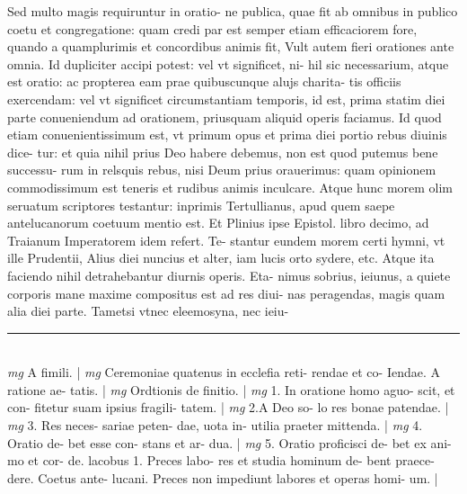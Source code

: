 \documentclass{article}
\begin{document}
\begin{pages}
Sed multo magis requiruntur in oratio- ne publica, quae fit ab omnibus in publico coetu et congregatione: quam credi par est semper etiam efficaciorem fore, quando a quamplurimis et concordibus animis fit, Vult autem fieri orationes ante omnia. Id dupliciter accipi potest: vel vt significet, ni- hil sic necessarium, atque est oratio: ac propterea eam prae quibuscunque  alujs charita- tis officiis exercendam: vel vt significet circumstantiam temporis, id est, prima statim diei parte conueniendum ad orationem, priusquam aliquid operis faciamus. Id quod etiam conuenientissimum est, vt primum opus et prima diei portio rebus diuinis dice- tur: et quia nihil prius Deo habere debemus, non est quod putemus bene successu- rum in relsquis rebus, nisi Deum prius orauerimus: quam opinionem commodissimum est teneris et rudibus animis inculcare. Atque hunc morem olim seruatum scriptores testantur: inprimis Tertullianus, apud quem saepe antelucanorum coetuum mentio est. Et Plinius ipse Epistol. libro decimo, ad Traianum Imperatorem idem refert. Te- stantur eundem morem certi hymni, vt ille Prudentii, Alius diei nuncius et alter, iam lucis orto sydere, etc. Atque ita faciendo nihil detrahebantur diurnis operis. Eta- nimus sobrius, ieiunus, a quiete corporis mane maxime compositus est ad res diui- nas peragendas, magis quam alia diei parte. Tametsi vtnec eleemosyna, nec ieiu-  \pend
\vspace{0.5cm}\noindent
\vspace{0.2cm}\rule{1cm}{0.2pt}\\ 
\hspace{0.2cm}\textit{mg}
\footnotesize A fimili. 
\normalsize| 
\hspace{0.2cm}\textit{mg}
\footnotesize Ceremoniae quatenus in ecclefia reti- rendae et co- Iendae. A ratione ae- tatis. 
\normalsize| 
\hspace{0.2cm}\textit{mg}
\footnotesize Ordtionis de finitio. 
\normalsize| 
\hspace{0.2cm}\textit{mg}
\footnotesize 1. In oratione homo aguo- scit, et con- fitetur suam ipsius fragili- tatem. 
\normalsize| 
\hspace{0.2cm}\textit{mg}
\footnotesize 2.A Deo so- lo res bonae patendae. 
\normalsize| 
\hspace{0.2cm}\textit{mg}
\footnotesize 3. Res neces- sariae peten- dae, uota in- utilia praeter mittenda. 
\normalsize| 
\hspace{0.2cm}\textit{mg}
\footnotesize 4. Oratio de- bet esse con- stans et ar- dua. 
\normalsize| 
\hspace{0.2cm}\textit{mg}
\footnotesize 5. Oratio proficisci de- bet ex ani- mo et cor- de. lacobus  1. Preces labo- res et studia hominum de- bent praece- dere. Coetus ante- lucani. Preces non impediunt labores et operas homi- um. 
\normalsize| 

\end{pages}
\end{document}
